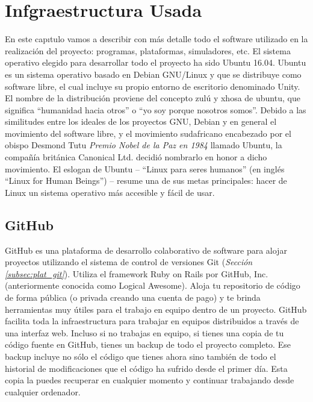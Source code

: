 \chapter{Infgraestructura Usada}
\label{ch:PlataformaDesarrollo}

En este capıtulo vamos a describir con más detalle todo el software utilizado en la realización del proyecto: programas, plataformas, simuladores, etc. El sistema operativo elegido para desarrollar todo el proyecto ha sido Ubuntu 16.04. Ubuntu es un sistema operativo basado en Debian GNU/Linux y que se distribuye como software libre, el cual incluye su propio entorno de escritorio denominado Unity. El nombre de la distribución proviene del concepto zulú y xhosa de ubuntu, que significa “humanidad hacia otros” o “yo soy porque nosotros somos”. Debido a las similitudes entre los ideales de los proyectos GNU, Debian y en general el movimiento del software libre, y el movimiento sudafricano encabezado por el obispo Desmond Tutu \textit{Premio Nobel de la Paz en 1984} llamado Ubuntu, la compañía británica Canonical Ltd. decidió nombrarlo en honor a dicho movimiento. El eslogan de Ubuntu – “Linux para seres humanos” (en inglés “Linux for Human Beings”) – resume una de sus metas principales: hacer de Linux un sistema operativo más accesible y fácil de usar.

\section{GitHub}
\label{sec:plat_github}

GitHub\cite{github} es una plataforma de desarrollo colaborativo de software para alojar proyectos utilizando el sistema de control de versiones Git (\textit{Sección \ref{subsec:plat_git}}). Utiliza el framework Ruby on Rails por GitHub, Inc. (anteriormente conocida como Logical Awesome). Aloja tu repositorio de código de forma pública (o privada creando una cuenta de pago) y te brinda herramientas muy útiles para el trabajo en equipo dentro de un proyecto. GitHub facilita toda la infraestructura para trabajar en equipos distribuidos a través de una interfaz web. Incluso si no trabajas en equipo, si tienes una copia de tu código fuente en GitHub, tienes un backup de todo el proyecto completo. Ese backup incluye no sólo el código que tienes ahora sino también de todo el historial de modificaciones que el código ha sufrido desde el primer día. Esta copia la puedes recuperar en cualquier momento y continuar trabajando desde cualquier ordenador.

